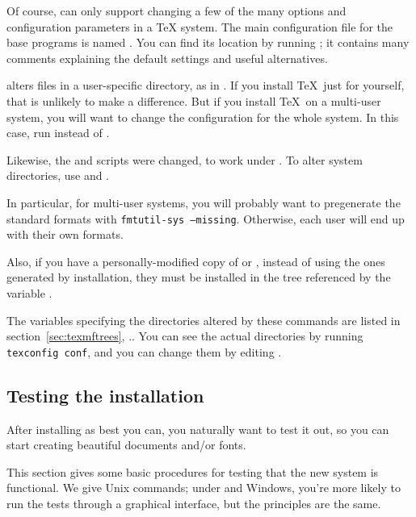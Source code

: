 \documentclass{article}
\begin{document}
Of course,  can only support changing a few of the
many options and configuration parameters in a \TeX{} system.  The main
configuration file for the base \Webc{} programs is named
.  You can find its location by running
; it contains many comments explaining the
default settings and useful alternatives.

 alters files in a user-specific directory, as in
.  If you install \TeX\ just for yourself,
that is unlikely to make a difference.  But if you install \TeX\ on a
multi-user system, you will want to change the configuration for the
whole system.  In this case, run  instead of
.

Likewise, the  and  scripts were
changed, to work under .  To alter system
directories, use  and .

In particular, for multi-user systems, you will probably want to
pregenerate the standard formats with \texttt{fmtutil-sys --missing}.
Otherwise, each user will end up with their own formats.

Also, if you have a personally-modified copy of 
or , instead of using the ones generated by
installation, they must be installed in the tree referenced by the
variable .

The variables specifying the directories altered by these commands are
listed in section~\ref{sec:texmftrees}, \p.\pageref{sec:texmftrees}.
You can see the actual directories by running \texttt{texconfig conf},
and you can change them by editing .


\subsection{Testing the installation}
\label{sec:test-install}

After installing \TL{} as best you can, you naturally want to test
it out, so you can start creating beautiful documents and\slash or fonts.

This section gives some basic procedures for testing that the new system
is functional.  We give Unix commands; under \MacOSX{} and Windows,
you're more likely to run the tests through a graphical interface, but
the principles are the same.
\end{document}

